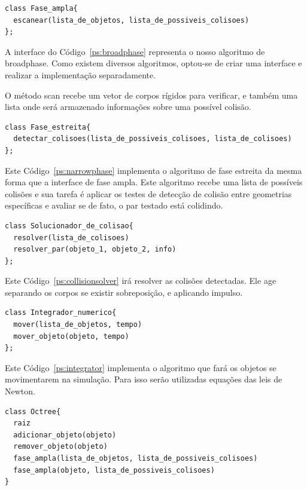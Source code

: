 \begin{lstlisting}[frame=single,caption=Modelagem prévia para fase ampla\label{ps:broadphase}]
class Fase_ampla{
  escanear(lista_de_objetos, lista_de_possiveis_colisoes)
};
\end{lstlisting}

A interface do Código~\ref{ps:broadphase} representa o nosso algoritmo de broadphase. Como existem diversos algoritmos, optou-se de criar uma interface e realizar a implementação separadamente.

O método scan recebe um vetor de corpos rígidos para verificar, e também uma lista onde será armazenado informações sobre uma possível colisão.

\begin{lstlisting}[frame=single,caption=Modelagem prévia para fase estreita\label{ps:narrowphase}]
class Fase_estreita{
  detectar_colisoes(lista_de_possiveis_colisoes, lista_de_colisoes)
};
\end{lstlisting}

Este Código~\ref{ps:narrowphase} implementa o algoritmo de fase estreita da mesma forma que a interface de fase ampla. Este algoritmo recebe uma lista de possíveis colisões e sua tarefa é aplicar os testes de detecção de colisão entre geometrias específicas e avaliar se de fato, o par testado está colidindo.

\begin{lstlisting}[frame=single,caption=Modelagem prévia para solucionador de colisões\label{ps:collisionsolver}]
class Solucionador_de_colisao{
  resolver(lista_de_colisoes)
  resolver_par(objeto_1, objeto_2, info)
};
\end{lstlisting}

Este Código~\ref{ps:collisionsolver} irá resolver as colisões detectadas. Ele age separando os corpos se existir sobreposição, e aplicando impulso.

\begin{lstlisting}[frame=single,caption=Modelagem prévia para integrador numérico\label{ps:integrator}]
class Integrador_numerico{
  mover(lista_de_objetos, tempo)
  mover_objeto(objeto, tempo)
};
\end{lstlisting}

Este Código~\ref{ps:integrator} implementa o algoritmo que fará os objetos se movimentarem na simulação. Para isso serão utilizadas equações das leis de Newton.

\begin{lstlisting}[frame=single,caption=Modelagem prévia para octree\label{ps:octree}]
class Octree{
  raiz
  adicionar_objeto(objeto)
  remover_objeto(objeto)
  fase_ampla(lista_de_objetos, lista_de_possiveis_colisoes)
  fase_ampla(objeto, lista_de_possiveis_colisoes)
}
\end{lstlisting}

